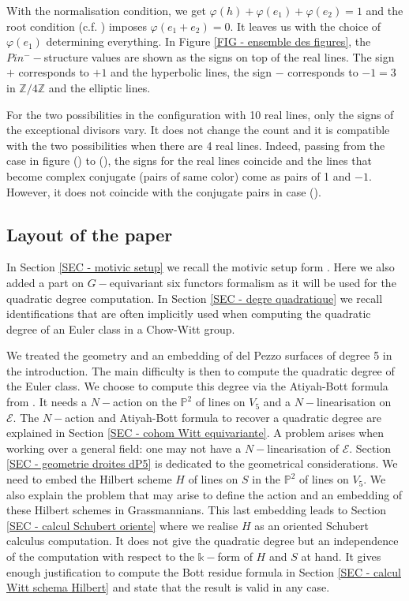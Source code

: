 \documentclass{amsart}
\theoremstyle{plain}%
\theoremstyle{remark}
\theoremstyle{definition}
\newcommand{\cE}{\mathcal{E}}
\newcommand{\ek}{\mathbb{k}}
\newcommand{\eP}{\mathbb{P}}
\newcommand{\eZ}{\mathbb{Z}}
\begin{document}
With the normalisation condition, we get $\varphi(h) +\varphi(e_1)+\varphi(e_2) = 1$ and the root condition (c.f. \cite[Section 2.1 and Section 3.2]{FK_real-lines}) imposes $\varphi(e_1+e_2) = 0.$ It leaves us with the choice of $\varphi(e_1)$ determining everything. In Figure \ref{FIG - ensemble des figures}, the $Pin^- -$structure values are shown as the signs on top of the real lines. The sign $+$ corresponds to $+1$ and the hyperbolic lines, the sign $-$ corresponds to $-1 = 3$ in $\eZ/4\eZ$ and the elliptic lines.

For the two possibilities in the configuration with 10 real lines, only the signs of the exceptional divisors vary. It does not change the count and it is compatible with the two possibilities when there are 4 real lines. Indeed, passing from the case in figure () to (), the signs for the real lines coincide and the lines that become complex conjugate (pairs of same color) come as pairs of 1 and $-1$. However, it does not coincide with the conjugate pairs in case ().





\subsection*{Layout of the paper}

In Section \ref{SEC - motivic setup} we recall the motivic setup form \cite{Cha_dP2-4}. Here we also added a part on $G-$equivariant six functors formalism as it will be used for the quadratic degree computation. In Section \ref{SEC - degre quadratique} we recall identifications that are often implicitly used when computing the quadratic degree of an Euler class in a Chow-Witt group.

We treated the geometry and an embedding of del Pezzo surfaces of degree 5 in the introduction. The main difficulty is then to compute the quadratic degree of the Euler class. We choose to compute this degree via the Atiyah-Bott formula from \cite{LevineAB24}. It needs a $N-$action on the $\eP^2$ of lines on $V_5$ and a $N-$linearisation on $\cE.$ The $N-$action and Atiyah-Bott formula to recover a quadratic degree are explained in Section \ref{SEC - cohom Witt equivariante}. A problem arises when working over a general field: one may not have a $N-$linearisation of $\cE$. Section \ref{SEC - geometrie droites dP5} is dedicated to the geometrical considerations. We need to embed the Hilbert scheme $H$ of lines on $S$ in the $\eP^2$ of lines on $V_5.$ We also explain the problem that may arise to define the action and an embedding of these Hilbert schemes in Grassmannians. This last embedding leads to Section \ref{SEC - calcul Schubert oriente} where we realise $H$ as an oriented Schubert calculus computation. It does not give the quadratic degree but an independence of the computation with respect to the $\ek-$form of $H$ and $S$ at hand. It gives enough justification to compute the Bott residue formula in Section \ref{SEC - calcul Witt schema Hilbert} and state that the result is valid in any case.
\end{document}
